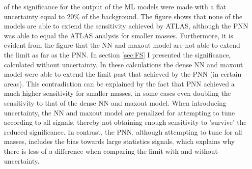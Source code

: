 of the significance for the output of the \ac{ML} models were made with a flat uncertainty equal to $20\%$ of the background.
The figure shows that none of the models are able to extend the sensitivity achieved by \ac{ATLAS}, although the \ac{PNN} was able to equal
the \ac{ATLAS} analysis for smaller masses. Furthermore, it is evident from the figure that the \ac{NN} and maxout model are not able to 
extend the limit as far as the \ac{PNN}. In section \ref{sec:FS} I presented the significance, calculated without uncertainty. In these
calculations the dense \ac{NN} and maxout model were able to extend the limit past that achieved by the \ac{PNN} (in certain areas). 
This contradiction can be explained by the fact that \ac{PNN} achieved a much higher sensitivity for smaller masses, in some cases even 
doubling the sensitivity to that of the dense \ac{NN} and maxout model. When introducing uncertainty, the \ac{NN} and maxout model are 
penalized for attempting to tune according to all signals, thereby not obtaining enough sensitivity to 'survive' the reduced significance. 
In contrast, the \ac{PNN}, although attempting to tune for all masses, includes the bias towards large statistics signals, which explains why there 
is less of a difference when comparing the limit with and without uncertainty.\\
